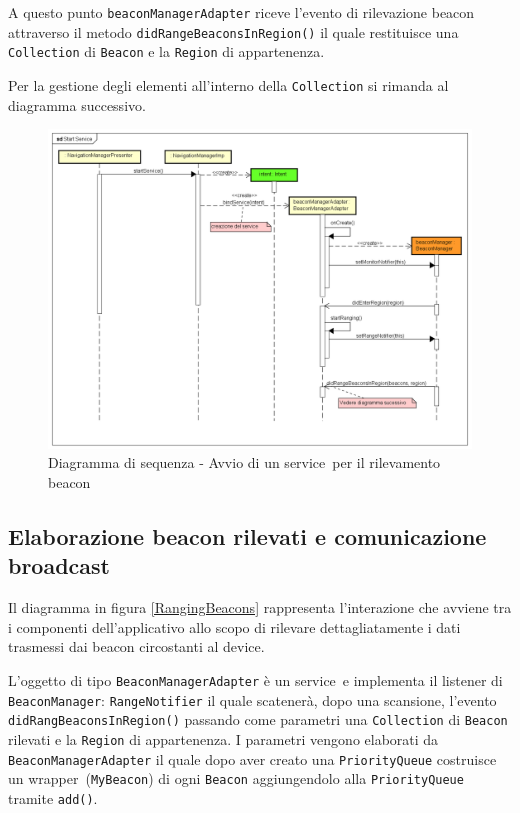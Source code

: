 \documentclass[../DefinizioneDiProdotto.tex]{subfiles}
\begin{document}
	A questo punto \verb|beaconManagerAdapter| riceve l'evento di rilevazione beacon attraverso il metodo \verb|didRangeBeaconsInRegion()| il quale restituisce una \verb|Collection| di \verb|Beacon| e la \verb|Region| di appartenenza.
	
	Per la gestione degli elementi all'interno della \verb|Collection| si rimanda al diagramma successivo.
	
		\begin{figure} [p]
			\includegraphics[width=\textwidth]{diagrams/StartService}
			\caption{Diagramma di sequenza - Avvio di un service\g\ per il rilevamento beacon}
			\label{StartService}
		\end{figure}
		

	\newpage		
	\subsection{Elaborazione beacon rilevati e comunicazione broadcast}
	
		Il diagramma in figura \ref{RangingBeacons} rappresenta l'interazione che avviene tra i componenti dell'applicativo allo scopo di rilevare dettagliatamente i dati trasmessi dai beacon circostanti al device.
		
L'oggetto di tipo \verb|BeaconManagerAdapter| è un service\g\ e implementa il listener di \verb|BeaconManager|: \verb|RangeNotifier| il quale scatenerà, dopo una scansione, l'evento  \verb|didRangBeaconsInRegion()| passando come parametri una \verb|Collection| di \verb|Beacon| rilevati e la \verb|Region| di appartenenza. 
	I parametri vengono elaborati da \verb|BeaconManagerAdapter| il quale dopo aver creato una \verb|PriorityQueue| costruisce un wrapper\g\ (\verb|MyBeacon|) di ogni \verb|Beacon| aggiungendolo alla \verb|PriorityQueue| tramite \verb|add()|.
	
\end{document}
